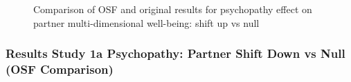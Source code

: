 \documentclass[
  singlecolumn]{article}
\begin{document}
\begin{figure}


\caption{\label{fig-results-psychopathy-partner-up-comparison}Comparison
of OSF and original results for psychopathy effect on partner
multi-dimensional well-being: shift up vs null}

\end{figure}%

\newpage{}

\subsubsection{Results Study 1a Psychopathy: Partner Shift Down vs Null
(OSF
Comparison)}\label{results-study-1a-psychopathy-partner-shift-down-vs-null-osf-comparison}
\end{document}
